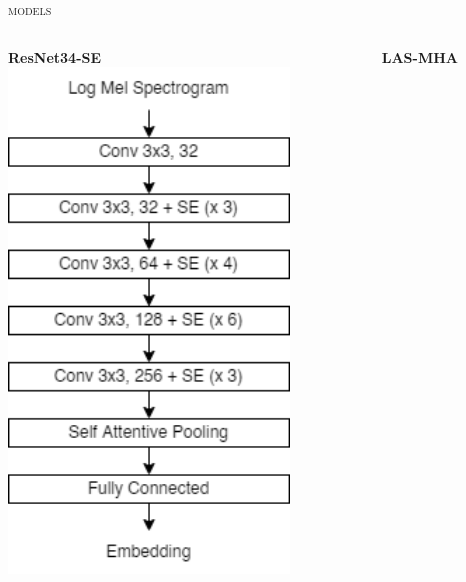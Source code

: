 \documentclass[10pt,aspectratio=1610,professionalfont]{beamer}
\begin{document}
\begin{frame}{\textsc{models}}
     \begin{columns}
		\begin{column}{0.33\textwidth}
			\begin{center}
				\textbf{\large{ResNet34-SE}}
		     		\includegraphics[width=0.8\textwidth]{img/resnet34se.png}
		    	\end{center}
		\end{column}
		\begin{column}{0.33\textwidth}
			\begin{center}
				\hspace{-7.5mm}\textbf{\large{LAS-MHA}}

\end{center}
\end{column}
\end{columns}
\end{frame}
\end{document}
